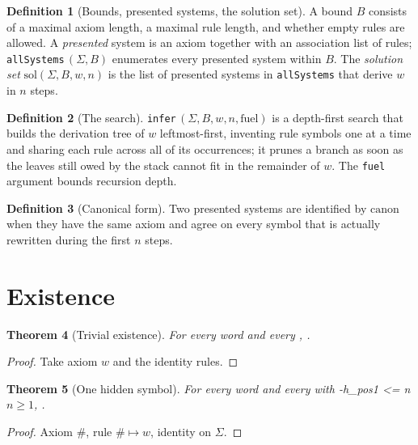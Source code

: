 \documentclass[11pt]{article}
\newtheorem{theorem}{Theorem}
\theoremstyle{definition}
\newtheorem{definition}[theorem]{Definition}
\theoremstyle{remark}
\begin{document}
\begin{definition}[Bounds, presented systems, the solution set]
A bound $B$ consists of a maximal axiom length, a maximal rule length, and whether empty
rules are allowed. A \emph{presented} system is an axiom together with an association list
of rules; \texttt{allSystems}\,$(\Sigma,B)$ enumerates every presented system within $B$.
The \emph{solution set} $\mathrm{sol}(\Sigma,B,w,n)$ is the list of presented systems in
\texttt{allSystems} that derive $w$ in $n$ steps.
\end{definition}

\begin{definition}[The search]
\texttt{infer}\,$(\Sigma,B,w,n,\mathrm{fuel})$ is a depth-first search that builds the
derivation tree of $w$ leftmost-first, inventing rule symbols one at a time and sharing each
rule across all of its occurrences; it prunes a branch as soon as the leaves still owed by
the stack cannot fit in the remainder of $w$. The \texttt{fuel} argument bounds recursion
depth.
\end{definition}

\begin{definition}[Canonical form]
Two presented systems are identified by $\mathrm{canon}$ when they have the same axiom and
agree on every symbol that is actually rewritten during the first $n$ steps.
\end{definition}

\section{Existence}

\begin{theorem}[Trivial existence]
For every word  and every ,
.
\end{theorem}
\begin{proof}
Take axiom $w$ and the identity rules.
\end{proof}

\begin{theorem}[One hidden symbol]
For every word  and every  with
\hyp{h_pos}{1 <= n}{$n\ge 1$}, .
\end{theorem}
\begin{proof}
Axiom $\#$, rule $\#\mapsto w$, identity on $\Sigma$.
\end{proof}
\end{document}
